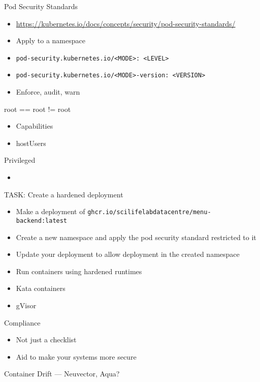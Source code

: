 \documentclass{dcpresentation}
\begin{document}
\begin{frame}{Pod Security Standards}
 \begin{itemize}
  \item \url{https://kubernetes.io/docs/concepts/security/pod-security-standards/}
  \item Apply to a namespace
  \item \texttt{pod-security.kubernetes.io/<MODE>: <LEVEL>}
  \item \texttt{pod-security.kubernetes.io/<MODE>-version: <VERSION>}
  \item Enforce, audit, warn
 \end{itemize}

\end{frame}


\begin{frame}{root == root != root}
 \begin{itemize}
  \item Capabilities
  \item hostUsers
 \end{itemize}
\end{frame}

\begin{frame}{Privileged}
 \begin{itemize}
  \item 
 \end{itemize}
\end{frame}


\begin{frame}{TASK: Create a hardened deployment}
 \begin{itemize}
  \item Make a deployment of \texttt{ghcr.io/scilifelabdatacentre/menu-backend:latest}
  \item Create a new namespace and apply the pod security standard restricted to it
  \item Update your deployment to allow deployment in the created namespace
 \end{itemize}
\end{frame}


\begin{frame}
 \begin{itemize}
  \item Run containers using hardened runtimes
  \item Kata containers
  \item gVisor
 \end{itemize}
\end{frame}
 
 \begin{frame}{Compliance}
  \begin{itemize}
   \item Not just a checklist
   \item Aid to make your systems more secure 
  \end{itemize}
 \end{frame}

 
 \begin{frame}
 Container Drift --- Neuvector, Aqua?
 \end{frame}
 
\end{document}
